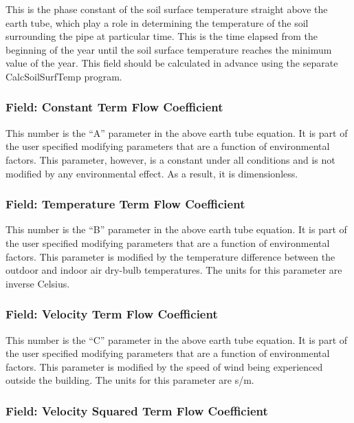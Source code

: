 This is the phase constant of the soil surface temperature straight above the earth tube, which play a role in determining the temperature of the soil surrounding the pipe at particular time. This is the time elapsed from the beginning of the year until the soil surface temperature reaches the minimum value of the year. This field should be calculated in advance using the separate CalcSoilSurfTemp program.

\subsubsection{Field: Constant Term Flow Coefficient}\label{field-constant-term-flow-coefficient}

This number is the ``A'' parameter in the above earth tube equation. It is part of the user specified modifying parameters that are a function of environmental factors. This parameter, however, is a constant under all conditions and is not modified by any environmental effect. As a result, it is dimensionless.

\subsubsection{Field: Temperature Term Flow Coefficient}\label{field-temperature-term-flow-coefficient}

This number is the ``B'' parameter in the above earth tube equation. It is part of the user specified modifying parameters that are a function of environmental factors. This parameter is modified by the temperature difference between the outdoor and indoor air dry-bulb temperatures. The units for this parameter are inverse Celsius.

\subsubsection{Field: Velocity Term Flow Coefficient}\label{field-velocity-term-flow-coefficient}

This number is the ``C'' parameter in the above earth tube equation. It is part of the user specified modifying parameters that are a function of environmental factors. This parameter is modified by the speed of wind being experienced outside the building. The units for this parameter are s/m.

\subsubsection{Field: Velocity Squared Term Flow Coefficient}\label{field-velocity-squared-term-flow-coefficient}

